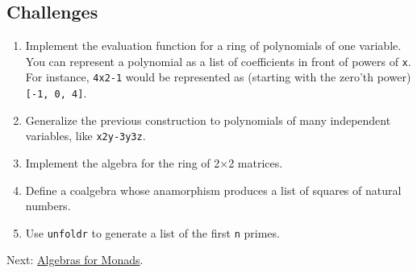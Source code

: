 \subsection{Challenges}\label{challenges}

\begin{enumerate}
\tightlist
\item
  Implement the evaluation function for a ring of polynomials of one
  variable. You can represent a polynomial as a list of coefficients in
  front of powers of \texttt{x}. For instance, \texttt{4x2-1} would be
  represented as (starting with the zero'th power)
  \texttt{{[}-1,\ 0,\ 4{]}}.
\item
  Generalize the previous construction to polynomials of many
  independent variables, like \texttt{x2y-3y3z}.
\item
  Implement the algebra for the ring of 2×2 matrices.
\item
  Define a coalgebra whose anamorphism produces a list of squares of
  natural numbers.
\item
  Use \texttt{unfoldr} to generate a list of the first \texttt{n}
  primes.
\end{enumerate}

Next:
\href{https://bartoszmilewski.com/2017/03/14/algebras-for-monads/}{Algebras
for Monads}.
